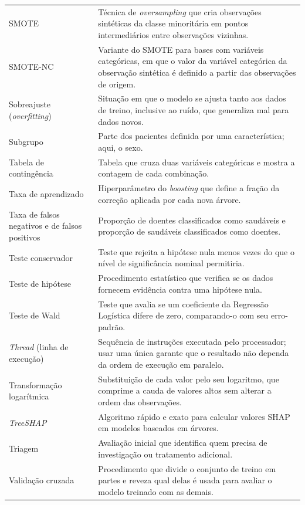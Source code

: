 \begin{longtable}{@{}p{3.8cm}p{10.7cm}@{}}
SMOTE & Técnica de \textit{oversampling} que cria observações sintéticas da classe minoritária em pontos intermediários entre observações vizinhas. \\[0.15cm]
SMOTE-NC & Variante do SMOTE para bases com variáveis categóricas, em que o valor da variável categórica da observação sintética é definido a partir das observações de origem. \\[0.15cm]
Sobreajuste (\textit{overfitting}) & Situação em que o modelo se ajusta tanto aos dados de treino, inclusive ao ruído, que generaliza mal para dados novos. \\[0.15cm]
Subgrupo & Parte dos pacientes definida por uma característica; aqui, o sexo. \\[0.15cm]
Tabela de contingência & Tabela que cruza duas variáveis categóricas e mostra a contagem de cada combinação. \\[0.15cm]
Taxa de aprendizado & Hiperparâmetro do \textit{boosting} que define a fração da correção aplicada por cada nova árvore. \\[0.15cm]
Taxa de falsos negativos e de falsos positivos & Proporção de doentes classificados como saudáveis e proporção de saudáveis classificados como doentes. \\[0.15cm]
Teste conservador & Teste que rejeita a hipótese nula menos vezes do que o nível de significância nominal permitiria. \\[0.15cm]
Teste de hipótese & Procedimento estatístico que verifica se os dados fornecem evidência contra uma hipótese nula. \\[0.15cm]
Teste de Wald & Teste que avalia se um coeficiente da Regressão Logística difere de zero, comparando-o com seu erro-padrão. \\[0.15cm]
\textit{Thread} (linha de execução) & Sequência de instruções executada pelo processador; usar uma única garante que o resultado não dependa da ordem de execução em paralelo. \\[0.15cm]
Transformação logarítmica & Substituição de cada valor pelo seu logaritmo, que comprime a cauda de valores altos sem alterar a ordem das observações. \\[0.15cm]
\textit{TreeSHAP} & Algoritmo rápido e exato para calcular valores SHAP em modelos baseados em árvores. \\[0.15cm]
Triagem & Avaliação inicial que identifica quem precisa de investigação ou tratamento adicional. \\[0.15cm]
Validação cruzada & Procedimento que divide o conjunto de treino em partes e reveza qual delas é usada para avaliar o modelo treinado com as demais. \\[0.15cm]

\end{longtable}
